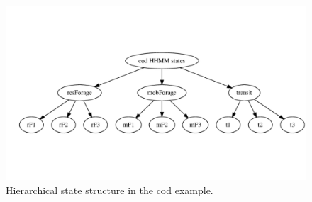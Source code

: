 \documentclass[12pt]{article}\usepackage[]{graphicx}\usepackage[]{color}
\begin{document}
\begin{figure}[htbp]
  \centering
  \includegraphics[width=\textwidth]{codStates.pdf}
  \caption{Hierarchical state structure in the cod example.}
  \label{fig:codStates}
\end{figure}
\end{document}
